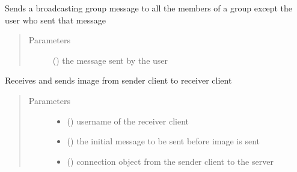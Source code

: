 \documentclass[letterpaper,10pt,english]{sphinxmanual}
\begin{document}

\begin{fulllineitems}
\label{\detokenize{server:server.send_group_text}}
Sends a broadcasting group message to all the members of a group except the user who sent that message
\begin{quote}\begin{description}
\item[{Parameters}] \leavevmode
{} () \textendash{} the message sent by the user

\end{description}\end{quote}

\end{fulllineitems}


\begin{fulllineitems}
\label{\detokenize{server:server.send_image}}
Receives and sends image from sender client to receiver client
\begin{quote}\begin{description}
\item[{Parameters}] \leavevmode\begin{itemize}
\item {} 
 () \textendash{} username of the receiver client

\item {} 
 () \textendash{} the initial message to be sent before image is sent

\item {} 
 () \textendash{} connection object from the sender client to the server

\end{itemize}

\end{description}\end{quote}

\end{fulllineitems}
\end{document}
